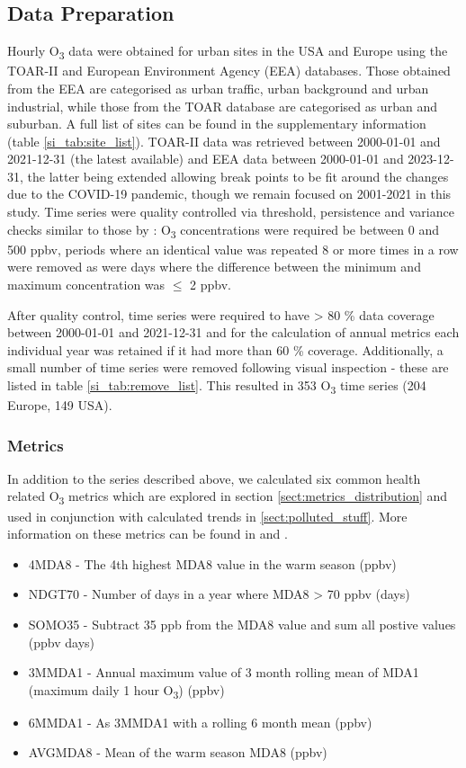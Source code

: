 \documentclass[journal abbreviation, manuscript]{copernicus}
\begin{document}
\subsection{Data Preparation} \label{sect:data_prep}
Hourly O\textsubscript{3} data were obtained for urban sites in the USA and Europe using the TOAR-II \citep{toar_db} and European Environment Agency (EEA) \citep{eea_1, eea_2} databases. Those obtained from the EEA are categorised as urban traffic, urban background and urban industrial, while those from the TOAR database are categorised as urban and suburban. A full list of sites can be found in the supplementary information (table \ref{si_tab:site_list}).  TOAR-II data was retrieved between 2000-01-01 and 2021-12-31 (the latest available) and EEA data between 2000-01-01 and 2023-12-31, the latter being extended allowing break points to be fit around the changes due to the COVID-19 pandemic, though we remain focused on 2001-2021 in this study. Time series were quality controlled via threshold, persistence and variance checks similar to those by \cite{Wang2023}: O\textsubscript{3} concentrations were required be between 0 and 500 ppbv, periods where an identical value was repeated 8 or more times in a row were removed as were days where the difference between the minimum and maximum concentration was $\leq$ 2 ppbv. 

After quality control, time series were required to have > 80 \% data coverage between 2000-01-01 and 2021-12-31 and for the calculation of annual metrics each individual year was retained if it had more than 60 \% coverage. Additionally, a small number of time series were removed following visual inspection - these are listed in table \ref{si_tab:remove_list}. This resulted in 353 O\textsubscript{3} time series (204 Europe, 149 USA). 

\subsubsection{Metrics}

In addition to the series described above, we calculated six common health related O\textsubscript{3} metrics which are explored in section \ref{sect:metrics_distribution} and used in conjunction with calculated trends in \ref{sect:polluted_stuff}. More information on these metrics can be found in \cite{10.1525/elementa.279} and \cite{fleming_2018}.

\begin{itemize}
    \item 4MDA8 - The 4th highest MDA8 value in the warm season (ppbv)
    \item NDGT70 - Number of days in a year where MDA8 > 70 ppbv (days)
    \item SOMO35 - Subtract 35 ppb from the MDA8 value and sum all postive values (ppbv days)
    \item 3MMDA1 - Annual maximum value of 3 month rolling mean of MDA1 (maximum daily 1 hour O\textsubscript{3}) (ppbv)
    \item 6MMDA1 - As 3MMDA1 with a rolling 6 month mean (ppbv)
    \item AVGMDA8 - Mean of the warm season MDA8 (ppbv)
\end{itemize}
\end{document}
